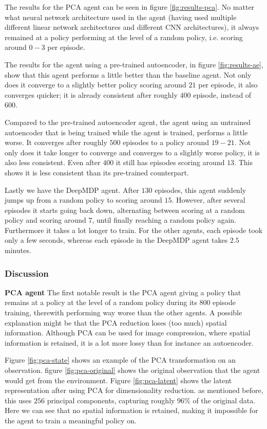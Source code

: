 The results for the PCA agent can be seen in figure \ref{fig:results-pca}. No matter what neural network architecture used in the agent (having used multiple different linear network architectures and different CNN architectures), it always remained at a policy performing at the level of a random policy, i.e. scoring around $0-3$ per episode.

The results for the agent using a pre-trained autoencoder, in figure \ref{fig:results-ae}, show that this agent performs a little better than the baseline agent. Not only does it converge to a slightly better policy scoring around $21$ per episode, it also converges quicker; it is already consistent after roughly $400$ episode, instead of $600$. 

Compared to the pre-trained autoencoder agent, the agent using an untrained autoencoder that is being trained while the agent is trained, performs a little worse. It converges after roughly $500$ episodes to a policy around $19-21$. Not only does it take longer to converge and converges to a slightly worse policy, it is also less consistent. Even after $400$ it still has episodes scoring around $13$. This shows it is less consistent than its pre-trained counterpart.

Lastly we have the DeepMDP agent. After $130$ episodes, this agent suddenly jumps up from a random policy to scoring around $15$. However, after several episodes it starts going back down, alternating between scoring at a random policy and scoring around $7$, until finally reaching a random policy again. Furthermore it takes a lot longer to train. For the other agents, each episode took only a few seconds, whereas each episode in the DeepMDP agent takes $2.5$ minutes.

\subsubsection{Discussion}\label{research-discussion-pysc2}
\textbf{PCA agent}\newline
\noindent
The first notable result is the PCA agent giving a policy that remains at a policy at the level of a random policy during its $800$ episode training, therewith performing way worse than the other agents. A possible explanation might be that the PCA reduction loses (too much) spatial information. Although PCA can be used for image compression, where spatial information is retained, it is a lot more lossy than for instance an autoencoder.

Figure \ref{fig:pca-state} shows an example of the PCA transformation on an observation. figure \ref{fig:pca-original} shows the original observation that the agent would get from the environment. Figure \ref{fig:pca-latent} shows the latent representation after using PCA for dimensionality reduction. as mentioned before, this uses $256$ principal components, capturing roughly $96\%$ of the original data. Here we can see that no spatial information is retained, making it impossible for the agent to train a meaningful policy on. 

